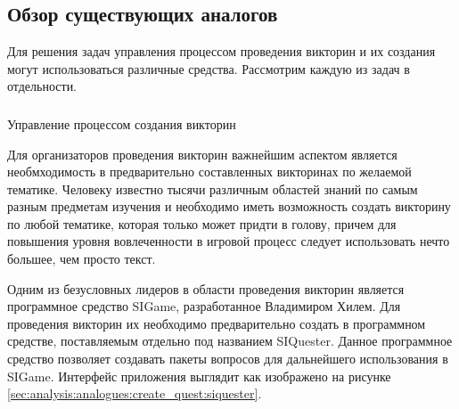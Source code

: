 \subsection{Обзор существующих аналогов}
\label{sec:analysis:analogues}

Для решения задач управления процессом проведения викторин и их создания могут использоваться различные средства. Рассмотрим каждую из задач в отдельности.

\subsubsection{} Управление процессом создания викторин
\label{sec:analysis:analogues:create_quest}

Для организаторов проведения викторин важнейшим аспектом является необмходимость в предварительно составленных викторинах по желаемой тематике.
Человеку известно тысячи различным областей знаний по самым разным предметам изучения и необходимо иметь возможность создать викторину по любой тематике, которая только может
придти в голову, причем для повышения уровня вовлеченности в игровой процесс следует использовать нечто большее, чем просто текст.

Одним из безусловных лидеров в области проведения викторин является программное средство SIGame, разработанное Владимиром Хилем. Для проведения викторин их необходимо предварительно 
создать в программном средстве, поставляемым отдельно под названием SIQuester. Данное программное средство позволяет создавать пакеты вопросов для дальнейшего использования
в SIGame. Интерфейс приложения выглядит как изображено на рисунке \ref*{sec:analysis:analogues:create_quest:siquester}.

